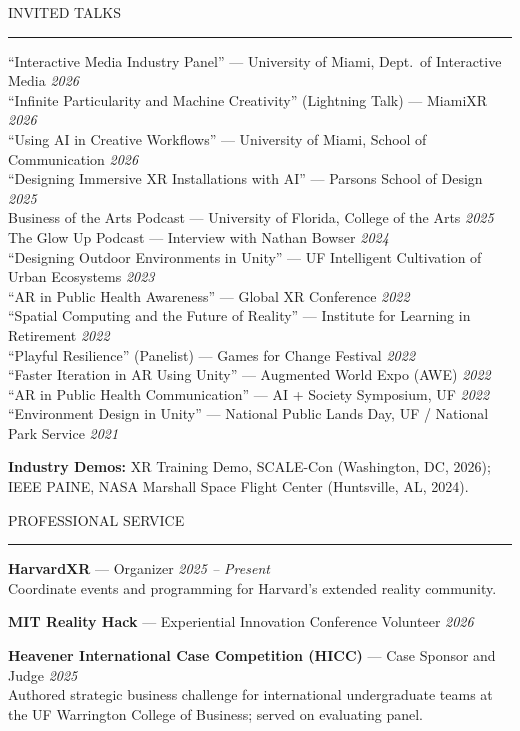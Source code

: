 \documentclass{resume} %
\renewenvironment{rSection}[1]{
  \needspace{4\baselineskip}
  \sectionskip
  \textcolor{CustomRed}{\MakeUppercase{#1}}
  \sectionlineskip
  \hrule
  \begin{list}{}{
    \setlength{\leftmargin}{1.5em}
  }
  \item[]
}{
  \end{list}
}
\begin{document}
\begin{rSection}{Invited Talks}
``Interactive Media Industry Panel'' --- University of Miami, Dept.\ of Interactive Media \hfill \emph{2026}\\
``Infinite Particularity and Machine Creativity'' (Lightning Talk) --- MiamiXR \hfill \emph{2026}\\
``Using AI in Creative Workflows'' --- University of Miami, School of Communication \hfill \emph{2026}\\
``Designing Immersive XR Installations with AI'' --- Parsons School of Design \hfill \emph{2025}\\
Business of the Arts Podcast --- University of Florida, College of the Arts \hfill \emph{2025}\\
The Glow Up Podcast --- Interview with Nathan Bowser \hfill \emph{2024}\\
``Designing Outdoor Environments in Unity'' --- UF Intelligent Cultivation of Urban Ecosystems \hfill \emph{2023}\\
``AR in Public Health Awareness'' --- Global XR Conference \hfill \emph{2022}\\
``Spatial Computing and the Future of Reality'' --- Institute for Learning in Retirement \hfill \emph{2022}\\
``Playful Resilience'' (Panelist) --- Games for Change Festival \hfill \emph{2022}\\
``Faster Iteration in AR Using Unity'' --- Augmented World Expo (AWE) \hfill \emph{2022}\\
``AR in Public Health Communication'' --- AI + Society Symposium, UF \hfill \emph{2022}\\
``Environment Design in Unity'' --- National Public Lands Day, UF / National Park Service \hfill \emph{2021}

\vspace{0.4em}
\textbf{Industry Demos:} XR Training Demo, SCALE-Con (Washington, DC, 2026); IEEE PAINE, NASA Marshall Space Flight Center (Huntsville, AL, 2024).
\end{rSection}

\begin{rSection}{Professional Service}
\textbf{HarvardXR} --- Organizer \hfill \emph{2025 -- Present}\\
Coordinate events and programming for Harvard's extended reality community.

\textbf{MIT Reality Hack} --- Experiential Innovation Conference Volunteer \hfill \emph{2026}

\textbf{Heavener International Case Competition (HICC)} --- Case Sponsor and Judge \hfill \emph{2025}\\
Authored strategic business challenge for international undergraduate teams at the UF Warrington College of Business; served on evaluating panel.
\end{rSection}
\end{document}
